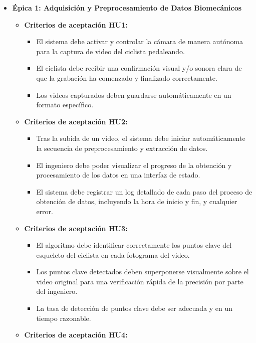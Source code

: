 \documentclass[
11pt, %
]{charter}
\begin{document}
\begin{itemize}
  \item \textbf{Épica 1: Adquisición y Preprocesamiento de Datos Biomecánicos}
    \begin{itemize}
      \item \textbf{Criterios de aceptación HU1:}
        \begin{itemize}
          \item El sistema debe activar y controlar la cámara de manera autónoma para la captura de video del ciclista pedaleando. 
          \item El ciclista debe recibir una confirmación visual y/o sonora clara de que la grabación ha comenzado y finalizado correctamente. 
          \item Los videos capturados deben guardarse automáticamente en un formato específico. 
        \end{itemize}
      \item \textbf{Criterios de aceptación HU2:}
        \begin{itemize}
          \item Tras la subida de un video, el sistema debe iniciar automáticamente la secuencia de preprocesamiento y extracción de datos.
          \item El ingeniero debe poder visualizar el progreso de la obtención y procesamiento de los datos en una interfaz de estado.
          \item El sistema debe registrar un log detallado de cada paso del proceso de obtención de datos, incluyendo la hora de inicio y fin, y cualquier error.
        \end{itemize}
      \item \textbf{Criterios de aceptación HU3:}
        \begin{itemize}
          \item El algoritmo debe identificar correctamente los puntos clave del esqueleto del ciclista  en cada fotograma del video.
          \item Los puntos clave detectados deben superponerse visualmente sobre el video original para una verificación rápida de la precisión por parte del ingeniero.
          \item La tasa de detección de puntos clave debe ser adecuada y en un tiempo razonable.
        \end{itemize}
      \item \textbf{Criterios de aceptación HU4:}
        \begin{itemize}

\end{itemize}
\end{itemize}
\end{itemize}
\end{document}
